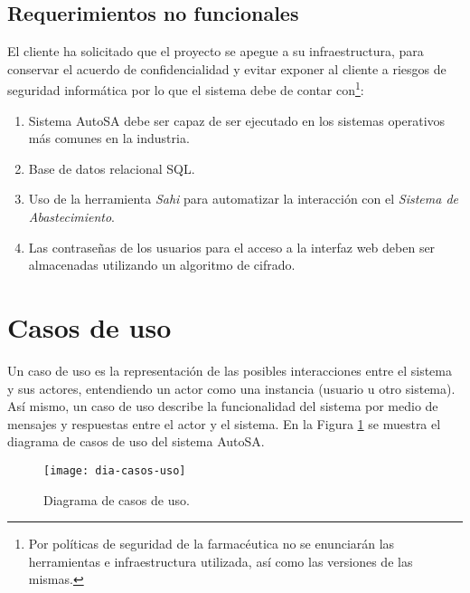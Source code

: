 \subsection{Requerimientos no funcionales}\label{sec:nonfunctional-req}
El cliente ha solicitado que el proyecto se apegue a su infraestructura, para conservar el acuerdo de confidencialidad y evitar exponer al cliente a riesgos de seguridad informática por lo que el sistema debe de contar con\footnote{Por políticas de seguridad de la farmacéutica no se enunciarán las herramientas e infraestructura utilizada, así como las versiones de las mismas.}:
\begin{enumerate}
\item Sistema AutoSA debe ser capaz de ser ejecutado en los sistemas operativos más comunes en la industria.
\item Base de datos relacional SQL.
\item Uso de la herramienta \textit{Sahi} para automatizar la interacción con el \textit{Sistema de Abastecimiento}.
\item Las contraseñas de los usuarios para el acceso a la interfaz web deben ser almacenadas utilizando un algoritmo de cifrado.
\end{enumerate}




\section{Casos de uso}\label{sec:casos-uso}
Un caso de uso es la representación de las posibles interacciones entre el sistema y sus actores, entendiendo un actor como una instancia (usuario u otro sistema). Así mismo, un caso de uso describe la funcionalidad del sistema por medio de mensajes y respuestas entre el actor y el sistema\cite{ApressSE}. En la Figura \ref{fig:dia-casos-uso} se muestra el diagrama de casos de uso del sistema AutoSA.

\begin{figure}[h]
  \centering
  \texttt{[image: dia-casos-uso]} 
  \caption{Diagrama de casos de uso.}
  \label{fig:dia-casos-uso}
\end{figure}

